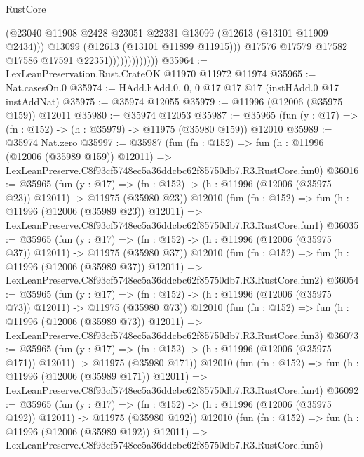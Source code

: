 \begin{lexlean}{RustCore}
\begin{coremodule}
                                (@23040
                                  @11908
                                  @2428
                                  @23051
                                  @22331
                                  @13099
                                  (@12613 (@13101 @11909 @2434)))
                                @13099
                                (@12613 (@13101 @11899 @11915)))
                              @17576
                              @17579
                              @17582
                              @17586
                              @17591
                              @22351)))))))))))))
@35964 := LexLeanPreservation.Rust.CrateOK @11970 @11972 @11974
@35965 := Nat.casesOn.{0}
@35974 := HAdd.hAdd.{0, 0, 0} @17 @17 @17 (instHAdd.{0} @17 instAddNat)
@35975 := @35974 @12055
@35979 := @11996 (@12006 (@35975 @159)) @12011
@35980 := @35974 @12053
@35987 := @35965 (fun (y : @17) => (fn : @152) -> (h : @35979) -> @11975 (@35980 @159)) @12010
@35989 := @35974 Nat.zero
@35997 := @35987
    (fun (fn : @152) =>
    fun (h : @11996 (@12006 (@35989 @159)) @12011) =>
    LexLeanPreserve.C8f93cf5748ec5a36ddcbc62f85750db7.R3.RustCore.fun0)
@36016 := @35965
    (fun (y : @17) =>
    (fn : @152) -> (h : @11996 (@12006 (@35975 @23)) @12011) -> @11975 (@35980 @23))
    @12010
    (fun (fn : @152) =>
    fun (h : @11996 (@12006 (@35989 @23)) @12011) =>
    LexLeanPreserve.C8f93cf5748ec5a36ddcbc62f85750db7.R3.RustCore.fun1)
@36035 := @35965
    (fun (y : @17) =>
    (fn : @152) -> (h : @11996 (@12006 (@35975 @37)) @12011) -> @11975 (@35980 @37))
    @12010
    (fun (fn : @152) =>
    fun (h : @11996 (@12006 (@35989 @37)) @12011) =>
    LexLeanPreserve.C8f93cf5748ec5a36ddcbc62f85750db7.R3.RustCore.fun2)
@36054 := @35965
    (fun (y : @17) =>
    (fn : @152) -> (h : @11996 (@12006 (@35975 @73)) @12011) -> @11975 (@35980 @73))
    @12010
    (fun (fn : @152) =>
    fun (h : @11996 (@12006 (@35989 @73)) @12011) =>
    LexLeanPreserve.C8f93cf5748ec5a36ddcbc62f85750db7.R3.RustCore.fun3)
@36073 := @35965
    (fun (y : @17) =>
    (fn : @152) -> (h : @11996 (@12006 (@35975 @171)) @12011) -> @11975 (@35980 @171))
    @12010
    (fun (fn : @152) =>
    fun (h : @11996 (@12006 (@35989 @171)) @12011) =>
    LexLeanPreserve.C8f93cf5748ec5a36ddcbc62f85750db7.R3.RustCore.fun4)
@36092 := @35965
    (fun (y : @17) =>
    (fn : @152) -> (h : @11996 (@12006 (@35975 @192)) @12011) -> @11975 (@35980 @192))
    @12010
    (fun (fn : @152) =>
    fun (h : @11996 (@12006 (@35989 @192)) @12011) =>
    LexLeanPreserve.C8f93cf5748ec5a36ddcbc62f85750db7.R3.RustCore.fun5)

\end{coremodule}
\end{lexlean}
